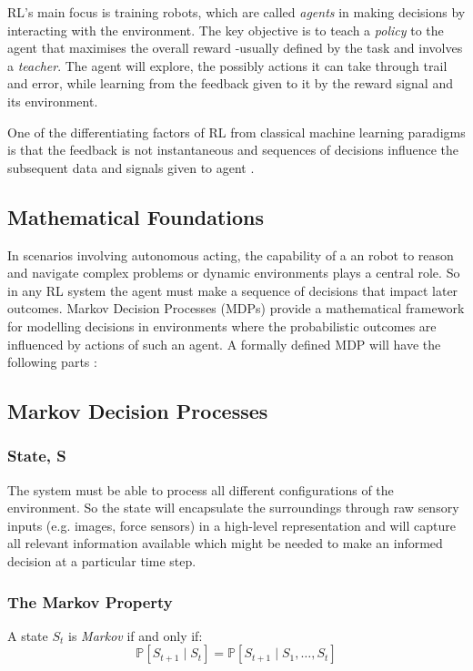   RL's main focus is training robots, which are called \emph{agents} in making decisions by interacting with the environment. The key objective is to teach a \emph{policy} to the agent that maximises the overall reward -usually defined by the task and involves a \emph{teacher}. The agent will explore, the possibly actions it can take through trail and error, while learning from the feedback given to it by the reward signal and its environment.

  One of the differentiating factors of RL from classical machine learning paradigms is that the feedback is not instantaneous and sequences of decisions influence the subsequent data and signals given to agent \cite{silver2015}.

\subsection{Mathematical Foundations}

  In scenarios involving autonomous acting, the capability of a an robot to reason and navigate complex problems or dynamic environments plays a central role. So in any RL system the agent must make a sequence of decisions that impact later outcomes. Markov Decision Processes (MDPs) provide a mathematical framework for modelling decisions in environments where the probabilistic outcomes are influenced by actions of such an agent. A formally defined MDP will have the following parts \cite{silver2015}:

\subsection{Markov Decision Processes}
  \subsubsection{State, S}
    The system must be able to process all different configurations of the environment. So the state will encapsulate the surroundings through raw sensory inputs (e.g. images, force sensors) in a high-level representation and will capture all relevant information available \cite{Sutton1998} which might be needed to make an informed decision at a particular time step.

  \subsubsection{The Markov Property}
    A state $S_t$ is \emph{Markov} if and only if:
    \[
      \mathbb{P} \left[S_{t+1} \mid S_t\right] = \mathbb{P}\left[ S_{t+1} \mid S_1, \ldots, S_t\right]
    \]

